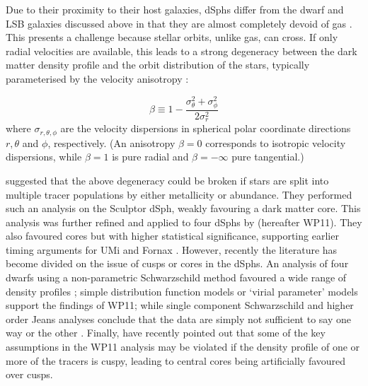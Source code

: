 Due to their proximity to their host galaxies, dSphs differ from the
dwarf and LSB galaxies discussed above in that they are almost
completely devoid of gas \citep[e.g.][]{Gatto+2013}. This presents a
challenge because stellar orbits, unlike gas, can cross. If only
radial velocities are available, this leads to a strong degeneracy
between the dark matter density profile and the orbit distribution of
the stars, typically parameterised by the velocity anisotropy
\citep[e.g.][]{Wilkinson+2002}:

\begin{equation}
    \label{eqn:beta}
    \beta \equiv 1 - \frac{\sigma_\theta^2 + \sigma_\phi^2}{2\sigma_r^2}
\end{equation}
where $\sigma_{r,\theta,\phi}$ are the velocity dispersions in
spherical polar coordinate directions $r, \theta$ and $\phi$,
respectively. (An anisotropy $\beta = 0$ corresponds to isotropic
velocity dispersions, while $\beta = 1$ is pure radial and $\beta =
-\infty$ pure tangential.)

\citet{Battaglia+2008} suggested that the above degeneracy could be broken if
stars are split into multiple tracer populations by either metallicity or
abundance. They performed such an analysis on the Sculptor dSph, weakly
favouring a dark matter core. This analysis was further refined and applied to
four dSphs by \citet{WalkerPenarrubia2011} (hereafter WP11). They also favoured
cores but with higher statistical significance, supporting earlier timing
arguments for UMi and Fornax \citep{Kleyna+2003, Goerdt+2006, Read+2006,
  Cole+2012}. However, recently the literature has become divided on the issue
of cusps or cores in the dSphs. An analysis of four dwarfs using a
non-parametric Schwarzschild method \citep{Schwarzschild1979} favoured a wide
range of density profiles \citep{Jardel+2013}; simple distribution function
models \citep{AmoriscoEvans2012} or `virial parameter' models \citep{Evans+2011}
support the findings of WP11; while single component Schwarzschild
\citep{BreddelsHelmi2013} and higher order Jeans \citep{RichardsonFairbairn2013}
analyses conclude that the data are simply not sufficient to say one way or the
other \citep[see also the discussion in][]{2014arXiv1404.5958B}. Finally,
\citet{2014arXiv1406.6079S} have recently pointed out that some of the key
assumptions in the WP11 analysis may be violated if the density profile of one
or more of the tracers is cuspy, leading to central cores being artificially
favoured over
cusps.


